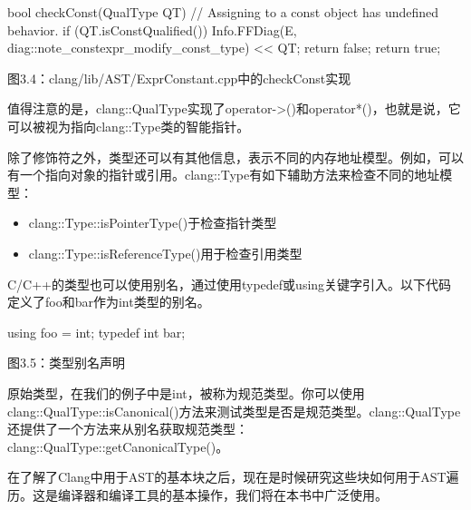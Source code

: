 \begin{cpp}
bool checkConst(QualType QT) {
  // Assigning to a const object has undefined behavior.
  if (QT.isConstQualified()) {
    Info.FFDiag(E, diag::note_constexpr_modify_const_type) << QT;
    return false;
  }
  return true;
}
\end{cpp}

\begin{center}
图3.4：clang/lib/AST/ExprConstant.cpp中的checkConst实现
\end{center}

值得注意的是，clang::QualType实现了operator->()和operator*()，也就是说，它可以被视为指向clang::Type类的智能指针。

除了修饰符之外，类型还可以有其他信息，表示不同的内存地址模型。例如，可以有一个指向对象的指针或引用。clang::Type有如下辅助方法来检查不同的地址模型：

\begin{itemize}
\item
clang::Type::isPointerType()于检查指针类型

\item
clang::Type::isReferenceType()用于检查引用类型
\end{itemize}

C/C++的类型也可以使用别名，通过使用typedef或using关键字引入。以下代码定义了foo和bar作为int类型的别名。

\begin{cpp}
using foo = int;
typedef int bar;
\end{cpp}

\begin{center}
图3.5：类型别名声明
\end{center}

原始类型，在我们的例子中是int，被称为规范类型。你可以使用clang::QualType::isCanonical()方法来测试类型是否是规范类型。clang::QualType还提供了一个方法来从别名获取规范类型：clang::QualType::getCanonicalType()。

在了解了Clang中用于AST的基本块之后，现在是时候研究这些块如何用于AST遍历。这是编译器和编译工具的基本操作，我们将在本书中广泛使用。









































